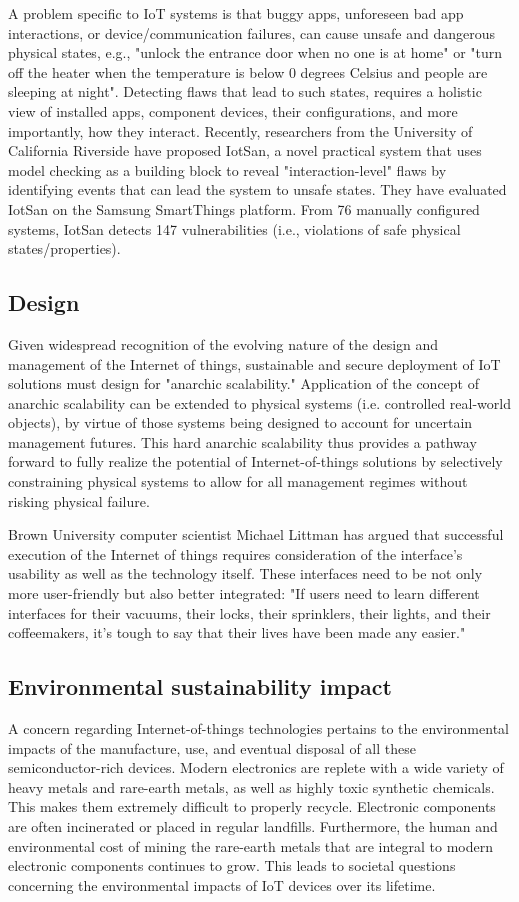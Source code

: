 \documentclass[12pt, a4paper, twoside]{article}
\begin{document}
A problem specific to IoT systems is that buggy apps, unforeseen bad app interactions, or device/communication failures, can cause unsafe and dangerous physical states, e.g., "unlock the entrance door when no one is at home" or "turn off the heater when the temperature is below 0 degrees Celsius and people are sleeping at night". Detecting flaws that lead to such states, requires a holistic view of installed apps, component devices, their configurations, and more importantly, how they interact. Recently, researchers from the University of California Riverside have proposed IotSan, a novel practical system that uses model checking as a building block to reveal "interaction-level" flaws by identifying events that can lead the system to unsafe states. They have evaluated IotSan on the Samsung SmartThings platform. From 76 manually configured systems, IotSan detects 147 vulnerabilities (i.e., violations of safe physical states/properties).

\subsection{Design}
Given widespread recognition of the evolving nature of the design and management of the Internet of things, sustainable and secure deployment of IoT solutions must design for "anarchic scalability." Application of the concept of anarchic scalability can be extended to physical systems (i.e. controlled real-world objects), by virtue of those systems being designed to account for uncertain management futures. This hard anarchic scalability thus provides a pathway forward to fully realize the potential of Internet-of-things solutions by selectively constraining physical systems to allow for all management regimes without risking physical failure.

Brown University computer scientist Michael Littman has argued that successful execution of the Internet of things requires consideration of the interface's usability as well as the technology itself. These interfaces need to be not only more user-friendly but also better integrated: "If users need to learn different interfaces for their vacuums, their locks, their sprinklers, their lights, and their coffeemakers, it's tough to say that their lives have been made any easier."

\subsection{Environmental sustainability impact}
A concern regarding Internet-of-things technologies pertains to the environmental impacts of the manufacture, use, and eventual disposal of all these semiconductor-rich devices. Modern electronics are replete with a wide variety of heavy metals and rare-earth metals, as well as highly toxic synthetic chemicals. This makes them extremely difficult to properly recycle. Electronic components are often incinerated or placed in regular landfills. Furthermore, the human and environmental cost of mining the rare-earth metals that are integral to modern electronic components continues to grow. This leads to societal questions concerning the environmental impacts of IoT devices over its lifetime.
\end{document}
